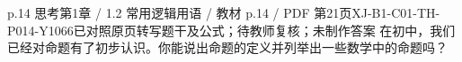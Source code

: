 \par\noindent\begin{minipage}{\linewidth}
\begin{bankitem}{p.14 思考}{第1章 / 1.2 常用逻辑用语 / 教材 p.14 / PDF 第21页}{XJ-B1-C01-TH-P014-Y1066}{已对照原页转写题干及公式；待教师复核；未制作答案}
在初中，我们已经对命题有了初步认识。你能说出命题的定义并列举出一些数学中的命题吗？
\end{bankitem}
\end{minipage}\par\medskip
